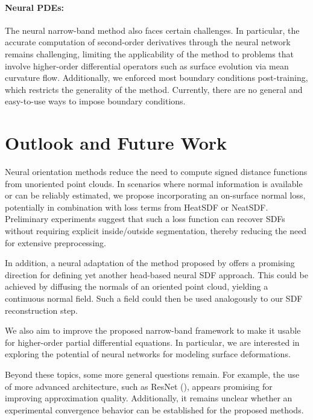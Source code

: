 \documentclass[12pt,openany]{book}
\theoremstyle{plainnormal}
\theoremstyle{remark}
\begin{document}
\paragraph{Neural PDEs:} The neural narrow-band method also faces certain challenges. In particular, the accurate computation of second-order derivatives through the neural network remains challenging, limiting the applicability of the method to problems that involve higher-order differential operators such as surface evolution via mean curvature flow. Additionally, we enforced most boundary conditions post-training, which restricts the generality of the method. Currently, there are no general and easy-to-use ways to impose boundary conditions. 
\section{Outlook and Future Work}
Neural orientation methods reduce the need to compute signed distance functions from unoriented point clouds. In scenarios where normal information is available or can be reliably estimated, we propose incorporating an on-surface normal loss, potentially in combination with loss terms from HeatSDF or NeatSDF. Preliminary experiments suggest that such a loss function can recover SDFs without requiring explicit inside/outside segmentation, thereby reducing the need for extensive preprocessing.\par
In addition, a neural adaptation of the method proposed by \cite{FengCrane} offers a promising direction for defining yet another head-based neural SDF approach. This could be achieved by diffusing the normals of an oriented point cloud, yielding a continuous normal field. Such a field could then be used analogously to our SDF reconstruction step.\par
We also aim to improve the proposed narrow-band framework to make it usable for higher-order partial differential equations. In particular, we are interested in exploring the potential of neural networks for modeling surface deformations.\par
Beyond these topics, some more general questions remain. For example, the use of more advanced architecture, such as ResNet (\cite{he2015deepresiduallearningimage}), appears promising for improving approximation quality. Additionally, it remains unclear whether an experimental convergence behavior can be established for the proposed methods.
\endgroup

\appendix
\end{document}
